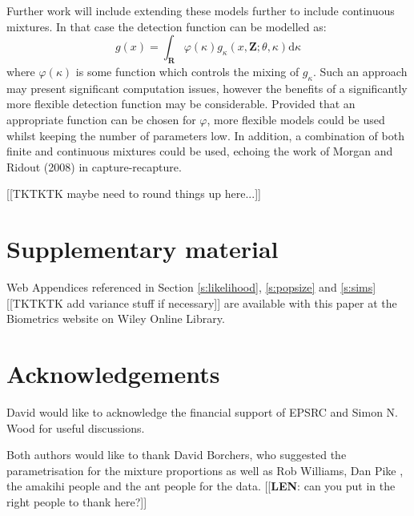 \documentclass[useAMS,referee]{biom}
\begin{document}
Further work will include extending these models further to include continuous mixtures. In that case the detection function can be modelled as:
\begin{equation*}
g(x) = \int_\mathbf{R} \varphi(\kappa) g_\kappa(x,\mathbf{Z}; \theta, \kappa) \text{d}\kappa
\end{equation*}
where $\varphi(\kappa)$ is some function which controls the mixing of $g_\kappa$. Such an approach may present significant computation issues, however the benefits of a significantly more flexible detection function may be considerable. Provided that an appropriate function can be chosen for $\varphi$, more flexible models could be used whilst keeping the number of parameters low. In addition, a combination of both finite and continuous mixtures could be used, echoing the work of Morgan and Ridout (2008) in capture-recapture.

[[TKTKTK maybe need to round things up here...]]


\backmatter


\section*{Supplementary material}

Web Appendices referenced in Section \ref{s:likelihood}, \ref{s:popsize} and \ref{s:sims} [[TKTKTK add variance stuff if necessary]] are available with this paper at the Biometrics website on Wiley Online Library.

\section*{Acknowledgements}

David would like to acknowledge the financial support of EPSRC and Simon N. Wood for useful discussions.

Both authors would like to thank David Borchers, who suggested the parametrisation for the mixture proportions as well as Rob Williams, Dan Pike , the amakihi people and the ant people for the data. [[\textbf{LEN}: can you put in the right people to thank here?]]
\end{document}
